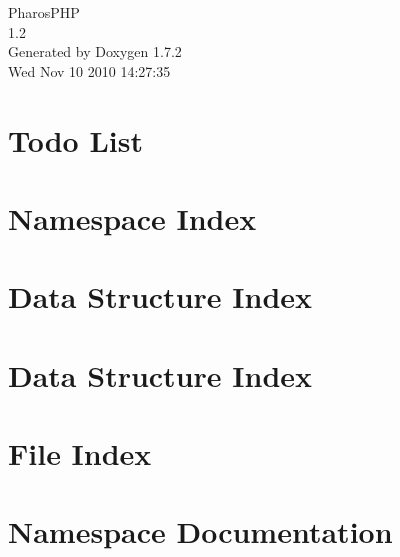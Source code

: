 \documentclass[a4paper]{book}
\begin{document}
\hypersetup{pageanchor=false}
\begin{titlepage}
\vspace*{7cm}
\begin{center}
{\Large PharosPHP \\[1ex]\large 1.2 }\\
\vspace*{1cm}
{\large Generated by Doxygen 1.7.2}\\
\vspace*{0.5cm}
{\small Wed Nov 10 2010 14:27:35}\\
\end{center}
\end{titlepage}
\clearemptydoublepage
{}
\tableofcontents
\clearemptydoublepage
{}
\hypersetup{pageanchor=true}
\chapter{Todo List}
\label{todo}
\hypertarget{todo}{}

\chapter{Namespace Index}

\chapter{Data Structure Index}

\chapter{Data Structure Index}

\chapter{File Index}

\chapter{Namespace Documentation}





\end{document}

